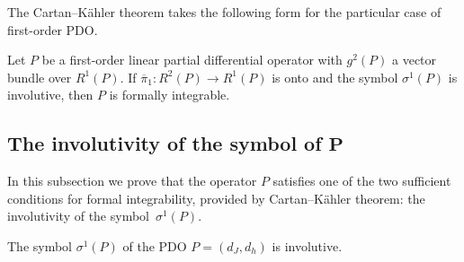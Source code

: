 \documentclass[pdftex]{sigma}
\begin{document}
The Cartan--K\"ahler theorem \cite{grifone00} takes the following form
for the particular case of f\/irst-order PDO.

\begin{theorem}
Let $P$ be a first-order linear partial differential operator with
$g^{2}(P)$ a vector bundle over $R^{1}(P)$. If $\overline{\pi}_{1}:R^{2}(P)\to R^{1}(P)$
is onto and the symbol $\sigma^{1}(P)$ is involutive, then $P$ is
formally integrable.
\end{theorem}

\subsection[The involutivity of the symbol of $P$]{The involutivity of the symbol of $\boldsymbol{P}$}

In this subsection we prove that the operator $P$ satisf\/ies one of
the two suf\/f\/icient conditions for formal integrability, provided by
Cartan--K\"ahler theorem: the involutivity of the symbol~$\sigma^{1}(P)$.

\begin{theorem}\label{thm:-involutivity}
The symbol $\sigma^{1}(P)$ of the PDO
$P=(d_{J},d_{h})$ is involutive.
\end{theorem}
\end{document}
